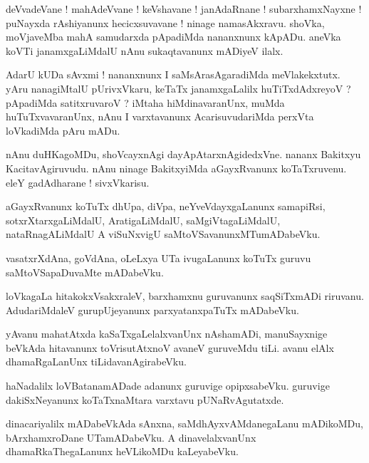 \documentclass{article}
\begin{document}
\begin{mn}%
deVvadeVane ! mahAdeVvane ! keVshavane ! janAdaRnane ! subarxhamxNayxne ! puNayxda rAshiyanunx 
hecicxsuvavane ! ninage namasAkxravu. shoVka, moVjaveMba mahA samudarxda pApadiMda nananxnunx 
kApADu. aneVka koVTi janamxgaLiMdalU nAnu sukaqtavanunx mADiyeV ilalx.
\end{mn}

\begin{mn}%
AdarU kUDa sAvxmi ! nananxnunx I saMsArasAgaradiMda meVlakekxtutx. yAru nanagiMtalU pUrivxVkaru, 
keTaTx janamxgaLalilx huTiTxdAdxreyoV ? pApadiMda satitxruvaroV ? iMtaha hiMdinavaranUnx, muMda 
huTuTxvavaranUnx, nAnu I varxtavanunx AcarisuvudariMda perxVta loVkadiMda pAru mADu.
\end{mn}

\begin{mn}%
nAnu duHKagoMDu, shoVcayxnAgi dayApAtarxnAgidedxVne. nananx Bakitxyu KacitavAgiruvudu. nAnu ninage 
BakitxyiMda aGayxRvanunx koTaTxruvenu. eleY gadAdharane ! sivxVkarisu.
\end{mn}

\begin{mn}%
aGayxRvanunx koTuTx dhUpa, diVpa, neYveVdayxgaLanunx samapiRsi, sotxrXtarxgaLiMdalU, 
AratigaLiMdalU, saMgiVtagaLiMdalU, nataRnagALiMdalU A viSuNxvigU saMtoVSavanunxMTumADabeVku.
\end{mn}

\begin{mn}%
vasatxrXdAna, goVdAna, oLeLxya UTa ivugaLanunx koTuTx guruvu saMtoVSapaDuvaMte mADabeVku.
\end{mn}

\begin{mn}%
loVkagaLa hitakokxVsakxraleV, barxhamxnu guruvanunx saqSiTxmADi riruvanu. AdudariMdaleV 
gurupUjeyanunx parxyatanxpaTuTx mADabeVku.
\end{mn}

\begin{mn}%
yAvanu mahatAtxda kaSaTxgaLelalxvanUnx nAshamADi, manuSayxnige beVkAda hitavanunx toVrisutAtxnoV 
avaneV guruveMdu tiLi. avanu elAlx dhamaRgaLanUnx tiLidavanAgirabeVku.
\end{mn}

\begin{mn}%
haNadalilx loVBatanamADade adanunx guruvige opipxsabeVku. guruvige dakiSxNeyanunx koTaTxnaMtara 
varxtavu pUNaRvAgutatxde.
\end{mn}

\begin{mn}%
dinacariyalilx mADabeVkAda sAnxna, saMdhAyxvAMdanegaLanu mADikoMDu, bArxhamxroDane UTamADabeVku. A 
dinavelalxvanUnx dhamaRkaThegaLanunx heVLikoMDu kaLeyabeVku.
\end{mn}
\end{document}
